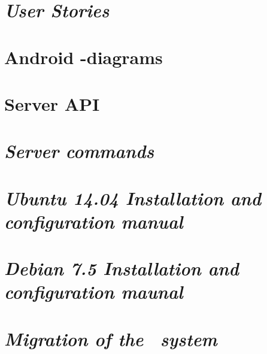 \begin{appendix}

\chapter{\textit{User Stories}}

\chapter{Android -diagrams}

\chapter{Server API}

\chapter{\textit{Server commands}}

\chapter{\textit{Ubuntu 14.04 Installation and configuration manual}}

\chapter{\textit{Debian 7.5 Installation and configuration maunal}}

\chapter{\textit{Migration of the \appName\ system}}

\end{appendix}
